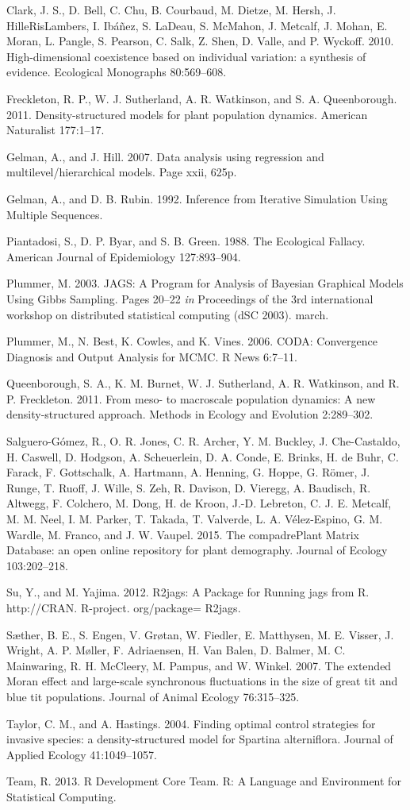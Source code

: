 \documentclass[12pt,]{article}
\begin{document}
Clark, J. S., D. Bell, C. Chu, B. Courbaud, M. Dietze, M. Hersh, J.
HilleRisLambers, I. Ibáñez, S. LaDeau, S. McMahon, J. Metcalf, J. Mohan,
E. Moran, L. Pangle, S. Pearson, C. Salk, Z. Shen, D. Valle, and P.
Wyckoff. 2010. High-dimensional coexistence based on individual
variation: a synthesis of evidence. Ecological Monographs 80:569--608.

Freckleton, R. P., W. J. Sutherland, A. R. Watkinson, and S. A.
Queenborough. 2011. Density-structured models for plant population
dynamics. American Naturalist 177:1--17.

Gelman, A., and J. Hill. 2007. Data analysis using regression and
multilevel/hierarchical models. Page xxii, 625p.

Gelman, A., and D. B. Rubin. 1992. Inference from Iterative Simulation
Using Multiple Sequences.

Piantadosi, S., D. P. Byar, and S. B. Green. 1988. The Ecological
Fallacy. American Journal of Epidemiology 127:893--904.

Plummer, M. 2003. JAGS: A Program for Analysis of Bayesian Graphical
Models Using Gibbs Sampling. Pages 20--22 \emph{in} Proceedings of the
3rd international workshop on distributed statistical computing (dSC
2003). march.

Plummer, M., N. Best, K. Cowles, and K. Vines. 2006. CODA: Convergence
Diagnosis and Output Analysis for MCMC. R News 6:7--11.

Queenborough, S. A., K. M. Burnet, W. J. Sutherland, A. R. Watkinson,
and R. P. Freckleton. 2011. From meso- to macroscale population
dynamics: A new density-structured approach. Methods in Ecology and
Evolution 2:289--302.

Salguero-Gómez, R., O. R. Jones, C. R. Archer, Y. M. Buckley, J.
Che-Castaldo, H. Caswell, D. Hodgson, A. Scheuerlein, D. A. Conde, E.
Brinks, H. de Buhr, C. Farack, F. Gottschalk, A. Hartmann, A. Henning,
G. Hoppe, G. Römer, J. Runge, T. Ruoff, J. Wille, S. Zeh, R. Davison, D.
Vieregg, A. Baudisch, R. Altwegg, F. Colchero, M. Dong, H. de Kroon,
J.-D. Lebreton, C. J. E. Metcalf, M. M. Neel, I. M. Parker, T. Takada,
T. Valverde, L. A. Vélez-Espino, G. M. Wardle, M. Franco, and J. W.
Vaupel. 2015. The compadrePlant Matrix Database: an open online
repository for plant demography. Journal of Ecology 103:202--218.

Su, Y., and M. Yajima. 2012. R2jags: A Package for Running jags from R.
http://CRAN. R-project. org/package= R2jags.

Sæther, B. E., S. Engen, V. Grøtan, W. Fiedler, E. Matthysen, M. E.
Visser, J. Wright, A. P. Møller, F. Adriaensen, H. {Van Balen}, D.
Balmer, M. C. Mainwaring, R. H. McCleery, M. Pampus, and W. Winkel.
2007. The extended Moran effect and large-scale synchronous fluctuations
in the size of great tit and blue tit populations. Journal of Animal
Ecology 76:315--325.

Taylor, C. M., and A. Hastings. 2004. Finding optimal control strategies
for invasive species: a density-structured model for Spartina
alterniflora. Journal of Applied Ecology 41:1049--1057.

Team, R. 2013. R Development Core Team. R: A Language and Environment
for Statistical Computing.
\end{document}

